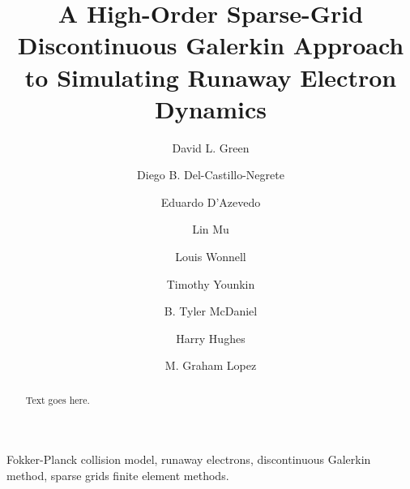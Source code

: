 \documentclass[preprint,11pt]{elsarticle}
\begin{document}
\begin{frontmatter}
\title{A High-Order Sparse-Grid Discontinuous Galerkin Approach to Simulating Runaway Electron Dynamics}
%
%
\author[1]{David L. Green}
%
\author[1]{Diego B. Del-Castillo-Negrete}
%
\author[2]{Eduardo D'Azevedo}
%
\author[3]{Lin Mu}%
%
\author[1]{Louis Wonnell}
\author[1]{Timothy Younkin}
\author[1]{B. Tyler McDaniel}
\author[1]{Harry Hughes}
\author[1]{M. Graham Lopez}
%
\address[1]{Fusion Energy Division, Oak Ridge National Laboratory, Oak Ridge, TN 37831, USA}
\address[2]{Computer Science and Mathematics Division, Oak Ridge National Laboratory, Oak Ridge, TN 37831, USA}
\address[3]{Department of  Mathematics, University of Georgia, Athens,  GA 30602, USA}
%
%
\begin{abstract}
Text goes here.
\end{abstract}
%
\begin{keyword}
Fokker-Planck collision model, runaway electrons, discontinuous Galerkin method, sparse grids finite element methods.
\end{keyword}
%
\end{frontmatter}
\end{document}
